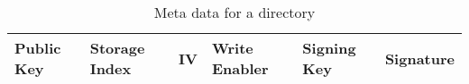 \begin{table}
  \centering
  \caption{Meta data for a directory}
  \begin{tabular}{ | l | l | l | l | l | l |}
    \hline
    Public Key & Storage Index & \acs{IV} & Write Enabler &  Signing Key  &  Signature  \\ 
    \hline
  \end{tabular}
  \label{tbl:folder:meta}
\end{table}
